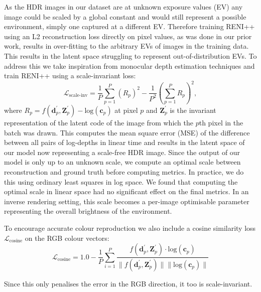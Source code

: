 As the HDR images in our dataset are at unknown exposure values (EV) any image could be scaled by a global constant and would still represent a possible environment, simply one captured at a different EV. Therefore training RENI++ using an L2 reconstruction loss directly on pixel values, as was done in our prior work, results in over-fitting to the arbitrary EVs of images in the training data. This results in the latent space struggling to represent out-of-distribution EVs. To address this we take inspiration from monocular depth estimation techniques \cite{eigenDepthMapPrediction2014, liMegaDepthLearningSingleView2018} and train RENI++ using a scale-invariant loss:
\begin{equation}
  \mathcal{L}_{\text {scale-inv}}=\frac{1}{P} \sum_{p=1}^P\left(R_p\right)^2-\frac{1}{P^2}\left(\sum_{p=1}^P R_p\right)^2,
\end{equation}
where $R_{p} = f(\mathbf{d}_p^\prime, \mathbf{Z}^\prime_p) - \text{log}(\mathbf{c}_p)$ at pixel $p$ and $\mathbf{Z}^\prime_p$ is the invariant representation of the latent code of the image from which the $p$th pixel in the batch was drawn. This computes the mean square error (MSE) of the difference between all pairs of log-depths in linear time and results in the latent space of our model now representing a scale-free HDR image. Since the output of our model is only up to an unknown scale, we compute an optimal scale between reconstruction and ground truth before computing metrics. In practice, we do this using ordinary least squares in log space. We found that computing the optimal scale in linear space had no significant effect on the final metrics. In an inverse rendering setting, this scale becomes a per-image optimisable parameter representing the overall brightness of the environment.

To encourage accurate colour reproduction we also include a cosine similarity loss $\mathcal{L}_\text{cosine}$ on the RGB colour vectors:
\begin{equation}\label{cosine_similarity_loss}
    \mathcal{L}_{\text{cosine}} = 1.0 - \frac{1}{P} \sum_{i=1}^P \frac{f(\mathbf{d}_p^\prime, \mathbf{Z}^\prime_p) \cdot \text{log}(\mathbf{c}_p)}{\|f(\mathbf{d}_p^\prime, \mathbf{Z}^\prime_p)\| \|\text{log}(\mathbf{c}_p)\|}
\end{equation}

Since this only penalises the error in the RGB direction, it too is scale-invariant.

